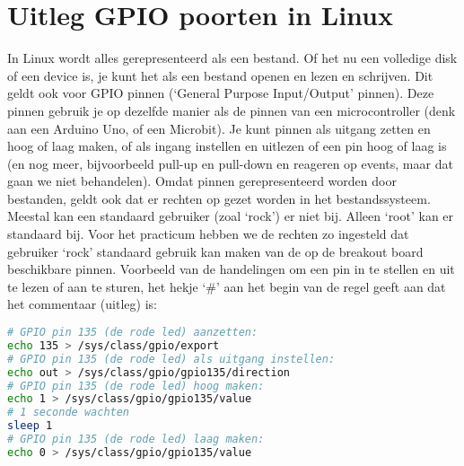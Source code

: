 
\newpage
\section{Uitleg GPIO poorten in Linux}\label{app:gpiolinux}
In Linux wordt alles gerepresenteerd als een bestand. Of het nu een volledige disk of een device is, je kunt het als een bestand openen en lezen en schrijven. Dit geldt ook voor GPIO pinnen (‘General Purpose Input/Output’ pinnen). Deze pinnen gebruik je op dezelfde manier als de pinnen van een microcontroller (denk aan een Arduino Uno, of een Microbit). Je kunt pinnen als uitgang zetten en hoog of laag maken, of als ingang instellen en uitlezen of een pin hoog of laag is (en nog meer, bijvoorbeeld pull-up en pull-down en reageren op events, maar dat gaan we niet behandelen).\newline
Omdat pinnen gerepresenteerd worden door bestanden, geldt ook dat er rechten op gezet worden in het bestandssysteem. Meestal kan een standaard gebruiker (zoal ‘rock’) er niet bij. Alleen ‘root’ kan er standaard bij. Voor het practicum hebben we de rechten zo ingesteld dat gebruiker ‘rock’ standaard gebruik kan maken van de op de breakout board beschikbare pinnen.\newline
Voorbeeld van de handelingen om een pin in te stellen en uit te lezen of aan te sturen, het hekje ‘\#’ aan het begin van de regel geeft aan dat het commentaar (uitleg) is:

\begin{lstlisting}[language=bash]
# GPIO pin 135 (de rode led) aanzetten:
echo 135 > /sys/class/gpio/export
# GPIO pin 135 (de rode led) als uitgang instellen:
echo out > /sys/class/gpio/gpio135/direction
# GPIO pin 135 (de rode led) hoog maken:
echo 1 > /sys/class/gpio/gpio135/value
# 1 seconde wachten
sleep 1
# GPIO pin 135 (de rode led) laag maken:
echo 0 > /sys/class/gpio/gpio135/value
\end{lstlisting}
	
